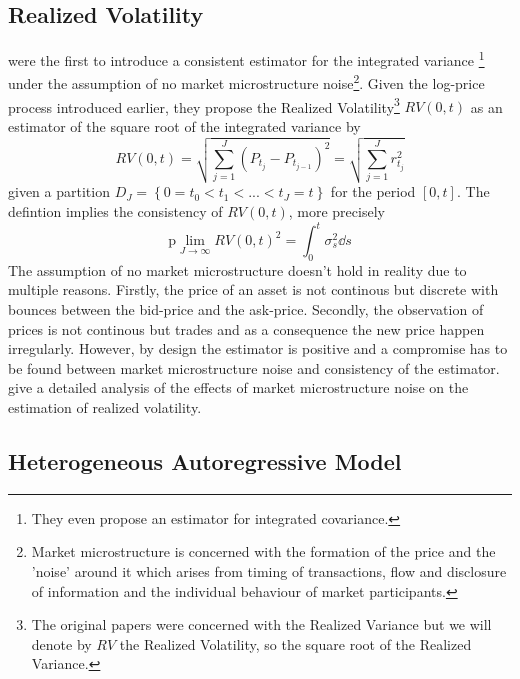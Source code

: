 \subsection{Realized Volatility}
\label{CH:Application:RV}

\cite{NielsenShephard2004} were the first to introduce a consistent estimator for the integrated variance \footnote{They even propose an estimator for integrated covariance.} under the assumption of no market microstructure noise\footnote{Market microstructure is concerned with the formation of the price and the 'noise' around it which arises from timing of transactions, flow and disclosure of information and the individual behaviour of market participants.}. Given the log-price process introduced earlier, they propose the Realized Volatility\footnote{The original papers were concerned with the Realized Variance but we will denote by $RV$ the Realized Volatility, so the square root of the Realized Variance.} $RV(0, t)$ as an estimator of the square root of the integrated variance by
\begin{equation}
    RV(0,t) = \sqrt{\sum_{j = 1}^{J} \left(P_{t_j} - P_{t_{j-1}}\right)^2} = \sqrt{\sum_{j = 1}^{J} r_{t_j}^2}
\end{equation}
given a partition $D_J = \left\{0 = t_0 < t_1 < ... < t_J = t\right\}$ for the period $\left[0, t\right]$. The defintion  implies the consistency of $RV(0,t)$, more precisely
\begin{equation}
    \text{p}\!\lim_{J \to \infty} RV(0,t)^2 = \int_{0}^{t} \sigma_s^2 \dd s
\end{equation}
The assumption of no market microstructure doesn't hold in reality due to multiple reasons. Firstly, the price of an asset is not continous but discrete with bounces between the bid-price and the ask-price. Secondly, the observation of prices is not continous but trades and as a consequence the new price happen irregularly. However, by design the estimator is positive and a compromise has to be found between market microstructure noise and consistency of the estimator.
\cite{Andersen2011MMN} give a detailed analysis of the effects of market microstructure noise on the estimation of realized volatility.

\subsection{Heterogeneous Autoregressive Model}

